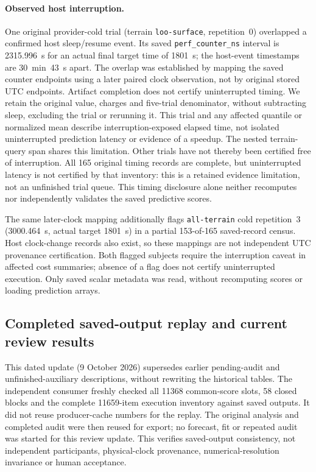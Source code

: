 \documentclass[11pt]{article}
\begin{document}
\paragraph{Observed host interruption.}
One original provider-cold trial (terrain \texttt{loo-surface}, repetition~0)
overlapped a confirmed host sleep/resume event. Its saved
\texttt{perf\_counter\_ns} interval is 2315.996~s for an actual final target
time of 1801~s; the host-event timestamps are 30~min~43~s apart.
The overlap was established by mapping the saved counter endpoints using
a later paired clock observation, not by original stored UTC endpoints.
Artifact completion does not certify uninterrupted timing. We retain the
original value, charges and five-trial denominator, without subtracting
sleep, excluding the trial or rerunning it. This trial and any affected
quantile or normalized mean describe interruption-exposed elapsed time,
not isolated uninterrupted prediction latency or evidence of a speedup.
The nested terrain-query span shares this limitation. Other trials have
not thereby been certified free of interruption. All 165 original timing
records are complete, but uninterrupted latency is not certified by that
inventory: this is a retained evidence limitation, not an unfinished trial queue.
This timing disclosure alone neither
recomputes nor independently validates the saved predictive scores.

The same later-clock mapping additionally flags \texttt{all-terrain} cold
repetition~3 (3000.464~s, actual target 1801~s) in a partial 153-of-165
saved-record census. Host clock-change records also exist, so these mappings
are not independent UTC provenance certification. Both flagged subjects
require the interruption caveat in affected cost summaries; absence of a
flag does not certify uninterrupted execution. Only saved scalar metadata
was read, without recomputing scores or loading prediction arrays.


\subsection{Completed saved-output replay and current review results}
\label{sec:audited-review-update}
This dated update (9 October 2026) supersedes earlier pending-audit and
unfinished-auxiliary descriptions, without rewriting the historical tables.
The independent consumer freshly checked all 11368 common-score slots,
58 closed blocks and the complete 11659-item execution inventory against
saved outputs. It did not reuse producer-cache numbers for the replay.
The original analysis and completed audit were then reused for export;
no forecast, fit or repeated audit was started for this review update.
This verifies saved-output consistency, not independent participants,
physical-clock provenance, numerical-resolution invariance or human acceptance.
\end{document}
